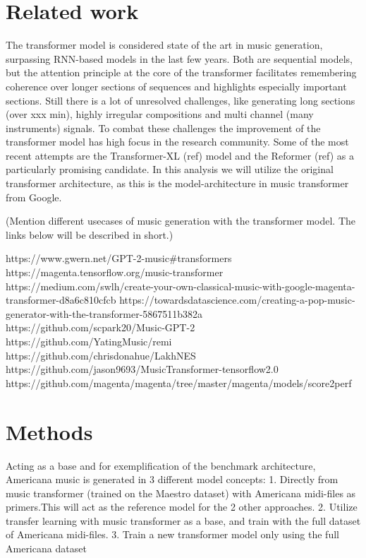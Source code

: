 \documentclass{article}
\begin{document}
    \section{Related work}
       The transformer model is considered state of the art in music generation, surpassing RNN-based models in the last few years. Both are sequential models, but the attention principle at the core of the transformer facilitates remembering coherence over longer sections of sequences and highlights especially important sections. Still there is a lot of unresolved challenges, like generating long sections (over xxx min), highly irregular compositions and multi channel (many instruments) signals. To combat these challenges the improvement of the transformer model has high focus in the research community. Some of the most recent attempts are the Transformer-XL (ref) model and the Reformer (ref) as a particularly promising candidate. In this analysis we will utilize the original transformer architecture, as this is the model-architecture in music transformer from Google.
        
        (Mention different usecases of music generation with the transformer model. The links below will be described in short.)
        
https://www.gwern.net/GPT-2-music#transformers
https://magenta.tensorflow.org/music-transformer
https://medium.com/swlh/create-your-own-classical-music-with-google-magenta-transformer-d8a6c810cfcb
https://towardsdatascience.com/creating-a-pop-music-generator-with-the-transformer-5867511b382a
https://github.com/scpark20/Music-GPT-2
https://github.com/YatingMusic/remi
https://github.com/chrisdonahue/LakhNES
https://github.com/jason9693/MusicTransformer-tensorflow2.0
https://github.com/magenta/magenta/tree/master/magenta/models/score2perf


    \section{Methods}

Acting as a base and for exemplification of the benchmark architecture, Americana music is generated in 3 different model concepts:
        1. Directly from music transformer (trained on the Maestro dataset) with Americana midi-files as primers.This will act as the reference model for the 2 other approaches.
        2. Utilize transfer learning with music transformer as a base, and train with the full dataset of Americana midi-files.
        3. Train a new transformer model only using the full Americana dataset
        
\end{document}

